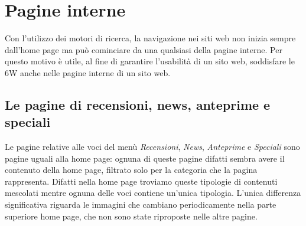 \documentclass[../ProgettoTecWeb2.tex]{subfiles}
\begin{document}
\section{Pagine interne}
	Con l'utilizzo dei motori di ricerca, la navigazione nei siti web non inizia sempre dall'home page ma può cominciare da una qualsiasi della pagine interne. Per questo motivo è utile, al fine di garantire l'usabilità di un sito web, soddisfare le 6W anche nelle pagine interne di un sito web.

	\subsection{Le pagine di recensioni, news, anteprime e speciali}
	Le pagine relative alle voci del menù \textit{Recensioni}, \textit{News}, \textit{Anteprime} e \textit{Speciali} sono pagine uguali alla home page: ognuna di queste pagine difatti sembra avere il contenuto della home page, filtrato solo per la categoria che la pagina rappresenta. Difatti nella home page troviamo queste tipologie di contenuti mescolati mentre ognuna delle voci contiene un'unica tipologia.
	L'unica differenza significativa riguarda le immagini che cambiano periodicamente nella parte superiore home page, che non sono state riproposte nelle altre pagine.
\end{document}

